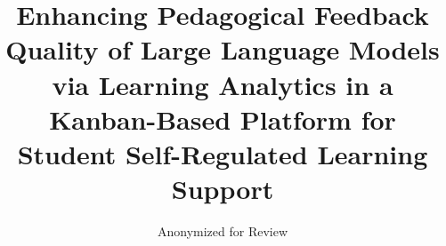 \documentclass[conference,a4paper]{IEEEtran}
\begin{document}
\title{Enhancing Pedagogical Feedback Quality of Large Language Models via Learning Analytics in a Kanban-Based Platform for Student Self-Regulated Learning Support}

\author{Anonymized for Review}


\maketitle
\end{document}
